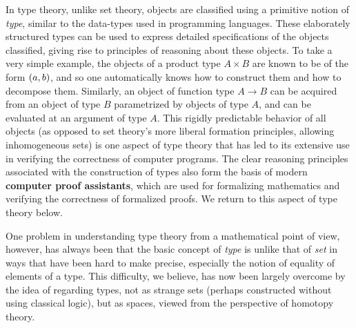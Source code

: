 
In type theory, unlike set theory, objects are classified using a primitive notion of \emph{type}, similar to the data-types used in programming languages.  These elaborately structured types can be used to express detailed specifications of the objects classified, giving rise to principles of reasoning about these objects.  To take a very simple example, the objects of a product type $A\times B$ are known to be of the form ${(a,b)}$, and so one automatically knows how to construct them and how to decompose them. Similarly, an object of function type $A\to B$ can be acquired from an object of type $B$ parametrized by objects of type $A$, and can be evaluated at an argument of type $A$.  This rigidly predictable behavior of all objects (as opposed to set theory's more liberal formation principles, allowing inhomogeneous sets) is one aspect of type theory that has led to its extensive use in verifying the correctness of computer programs.  The clear reasoning principles associated with the construction of types also form the basis of modern {\bf computer proof assistants}, which are used for formalizing mathematics and verifying the correctness of formalized proofs.  We return to this aspect of type theory below.  



One problem in understanding type theory from a mathematical point of view, however, has always been that the basic concept of \emph{type} is unlike that of \emph{set} in ways that have been hard to make precise, especially the notion of equality of elements of a type.  This difficulty, we believe, has now been largely overcome by the idea of regarding types, not as strange sets (perhaps constructed without using classical logic), but as spaces, viewed from the perspective of homotopy theory. 

